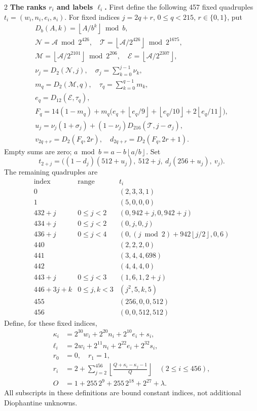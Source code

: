 \documentclass[10pt]{article}
\let\bigsum\sum
\renewcommand{\sum}{\bigsum\nolimits}
\newcommand{\fl}[1]{\left\lfloor #1\right\rfloor}
\begin{document}
\begin{multicols}{2}
\textbf{The ranks $r_i$ and labels $\ell_i$.}
First define the following 457 fixed quadruples
$t_i=(w_i,n_i,e_i,s_i)$.
For fixed indices $j=2q+r$, $0\le q<215$, $r\in\{0,1\}$, put
\[
\begin{gathered}
D_b(A,k)=\fl{A/b^k}\bmod b,\\
\mathcal N=\mathcal A\bmod2^{426},\quad
\mathcal T=\fl{\mathcal A/2^{426}}\bmod2^{1675},\\
\mathcal M=\fl{\mathcal A/2^{2101}}\bmod2^{206},\quad
\mathcal E=\fl{\mathcal A/2^{2307}},\\
\nu_j=D_2(\mathcal N,j),\quad \sigma_j=\sum_{k=0}^{j-1}\nu_k,\\
m_q=D_2(\mathcal M,q),\quad \tau_q=\sum_{k=0}^{q-1}m_k,\\
e_q=D_{12}(\mathcal E,\tau_q),\\
F_q=14(1-m_q)+m_q\bigl(e_q+\fl{e_q/9}+\fl{e_q/10}+2\fl{e_q/11}\bigr),\\
u_j=\nu_j(1+\sigma_j)+(1-\nu_j)D_{216}(\mathcal T,j-\sigma_j),\\
v_{2q+r}=D_2(F_q,2r),\quad d_{2q+r}=D_2(F_q,2r+1).
\end{gathered}
\]
Empty sums are zero; $a\bmod b=a-b\fl{a/b}$. Set
\[
t_{2+j}=\bigl((1-d_j)(512+u_j),\ 512+j,\ d_j(256+u_j),\ v_j\bigr).
\]
The remaining quadruples are
\[
\begin{array}{c|c|l}
\text{index}&\text{range}&t_i\\\hline
0&& (2,3,3,1)\\
1&& (5,0,0,0)\\
432+j&0\le j<2&(0,942+j,0,942+j)\\
434+j&0\le j<2&(0,j,0,j)\\
436+j&0\le j<4&(0,(j\bmod2)+942\fl{j/2},0,6)\\
440&&(2,2,2,0)\\
441&&(3,4,4,698)\\
442&&(4,4,4,0)\\
443+j&0\le j<3&(1,6,1,2+j)\\
446+3j+k&0\le j,k<3&(j^2,5,k,5)\\
455&&(256,0,0,512)\\
456&&(0,0,512,512)
\end{array}
\]
Define, for these fixed indices,
\begin{align*}
\kappa_i&=2^{30}w_i+2^{20}n_i+2^{10}e_i+s_i,\\
\ell_i&=2w_i+2^{11}n_i+2^{22}e_i+2^{32}s_i,\\
r_0&=0,\quad r_1=1,\\
r_i&=2+\sum_{j=2}^{456}\fl{\frac{Q+\kappa_i-\kappa_j-1}{Q}}
 \quad(2\le i\le456),\\
O&=1+255\,2^9+255\,2^{18}+2^{27}+\lambda.
\end{align*}
All subscripts in these definitions are bound constant indices, not
additional Diophantine unknowns.


\end{multicols}
\end{document}
